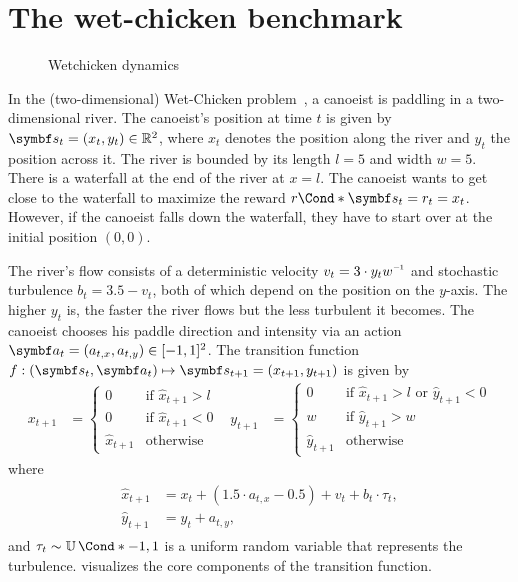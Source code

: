 \section{The wet-chicken benchmark}
\label{toc:interpretable_rl:wetchicken}
\begin{figure}[t]
    \centering
    
    \caption{
        \label{fig:interpretable_rl:wetchicken}
        Wetchicken dynamics
    }
\end{figure}
In the (two-dimensional) Wet-Chicken problem~\parencite{tresp_wet_1994,hans_efficient_2009}, a canoeist is paddling in a two-dimensional river.
The canoeist's position at time $t$ is given by $\mat{s}_t = (x_t, y_t) \in \Rb^2$, where $x_t$ denotes the position along the river and $y_t$ the position across it.
The river is bounded by its length $l = 5$ and width $w = 5$.
There is a waterfall at the end of the river at $x = l$.
The canoeist wants to get close to the waterfall to maximize the reward $\Fun*{r}{\mat{s}_t} = r_t = x_t$.
However, if the canoeist falls down the waterfall, they have to start over at the initial position $(0, 0)$.

The river's flow consists of a deterministic velocity $v_t = 3 \cdot y_t w\inv$ and stochastic turbulence $b_t = 3.5 - v_t$, both of which depend on the position on the $y$-axis.
The higher $y_t$ is, the faster the river flows but the less turbulent it becomes.
The canoeist chooses his paddle direction and intensity via an action $\mat{a}_t = (a_{t,x}, a_{t,y}) \in [-1, 1]^2$.
The transition function $f : (\mat{s}_t, \mat{a}_t) \mapsto \mat{s}_{t+1} = (x_{t+1}, y_{t+1})$ is given by
\begin{align}
    x_{t+1} & = \begin{cases}
        0             & \text{if } \hat{x}_{t+1} > l \\
        0             & \text{if } \hat{x}_{t+1} < 0 \\
        \hat{x}_{t+1} & \text{otherwise}
    \end{cases} &
    y_{t+1} & = \begin{cases}
        0             & \text{if } \hat{x}_{t+1} > l \text{ or } \hat{y}_{t+1} < 0 \\
        w             & \text{if } \hat{y}_{t+1} > w                               \\
        \hat{y}_{t+1} & \text{otherwise}
    \end{cases}
\end{align}
where
\begin{align}
    \begin{split}
        \hat{x}_{t+1} &= x_t + (1.5 \cdot a_{t, x} - 0.5)  + v_t + b_t \cdot \tau_t, \\
        \hat{y}_{t+1} &= y_t + a_{t, y},
    \end{split}
\end{align}
and $\tau_t \sim \Fun*{\Uni}{-1, 1}$ is a uniform random variable that represents the turbulence.
 visualizes the core components of the transition function.

